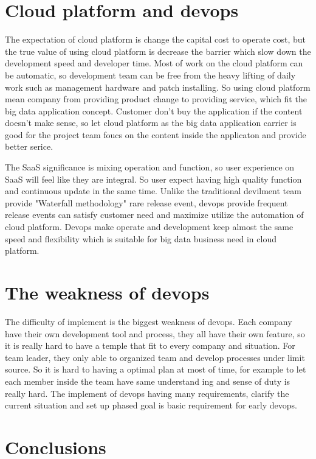 \documentclass[sigconf]{acmart}
\begin{document}
\section{Cloud platform and devops}
The expectation of cloud platform is change the capital cost to operate cost, but the true value of using cloud platform is decrease the barrier which slow down the development speed and developer time. Most of work on the cloud platform can be automatic, so development team can be free from the heavy lifting of daily work such as management hardware and patch installing. So using cloud platform mean company from providing product change to providing service, which fit the big data application concept. Customer don't buy the application if the content doesn't make sense, so let cloud platform as the big data application carrier is good for the project team foucs on the content inside the applicaton and provide better serice. 

The SaaS significance is mixing operation and function, so user experience on SaaS will feel like they are integral. So user expect having high quality function and continuous update in the same time. Unlike the traditional devilment team provide "Waterfall methodology" rare release event, devops provide frequent release events can satisfy customer need and maximize utilize the automation of cloud platform. Devops make operate and development keep almost the same speed and flexibility which is suitable for big data business need in cloud platform.

\section{The weakness of devops}

The difficulty of implement is the biggest weakness of devops. Each company have their own development tool and process, they all have their own feature, so it is really hard to have a temple that fit to every company and situation. For team leader, they only able to organized team and develop processes under limit source. So it is hard to having a optimal plan at most of time, for example to let each member inside the team have same understand ing and sense of duty is really hard. The implement of devops having many requirements, clarify the current situation and set up phased goal is basic requirement for early devops.

\section{Conclusions}
\end{document}
